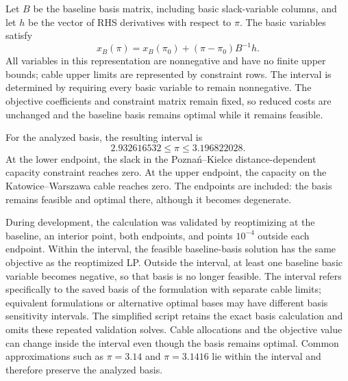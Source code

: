 \documentclass[11pt,a4paper]{article}
\begin{document}
Let $B$ be the baseline basis matrix, including basic slack-variable columns, and let $h$ be the vector of RHS derivatives with respect to $\pi$. The basic variables satisfy
\[
x_B(\pi)=x_B(\pi_0)+(\pi-\pi_0)B^{-1}h.
\]
All variables in this representation are nonnegative and have no finite upper bounds; cable upper limits are represented by constraint rows. The interval is determined by requiring every basic variable to remain nonnegative. The objective coefficients and constraint matrix remain fixed, so reduced costs are unchanged and the baseline basis remains optimal while it remains feasible.

For the analyzed basis, the resulting interval is
\[
\boxed{2.932616532\le\pi\le3.196822028.}
\]
At the lower endpoint, the slack in the Poznań--Kielce distance-dependent capacity constraint reaches zero. At the upper endpoint, the capacity on the Katowice--Warszawa cable reaches zero. The endpoints are included: the basis remains feasible and optimal there, although it becomes degenerate.

During development, the calculation was validated by reoptimizing at the baseline, an interior point, both endpoints, and points $10^{-4}$ outside each endpoint. Within the interval, the feasible baseline-basis solution has the same objective as the reoptimized LP. Outside the interval, at least one baseline basic variable becomes negative, so that basis is no longer feasible. The interval refers specifically to the saved basis of the formulation with separate cable limits; equivalent formulations or alternative optimal bases may have different basis sensitivity intervals. The simplified script retains the exact basis calculation and omits these repeated validation solves. Cable allocations and the objective value can change inside the interval even though the basis remains optimal. Common approximations such as $\pi=3.14$ and $\pi=3.1416$ lie within the interval and therefore preserve the analyzed basis.
\end{document}
